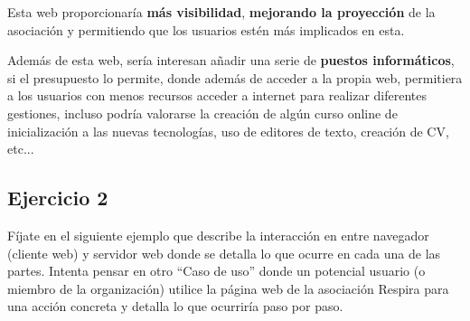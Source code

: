 Esta web proporcionaría \textbf{más visibilidad}, \textbf{mejorando la proyección} de la asociación y permitiendo que los usuarios estén más implicados en esta.

Además de esta web, sería interesan añadir una serie de\textbf{ puestos informáticos}, si el presupuesto lo permite, donde además de acceder a la propia web, permitiera a los usuarios con menos recursos acceder a internet para realizar diferentes gestiones, incluso podría valorarse la creación de algún curso online de inicialización a las nuevas tecnologías, uso de editores de texto, creación de CV, etc...

\subsection{Ejercicio 2}
Fíjate en el siguiente ejemplo que describe la interacción en entre navegador (cliente web) y servidor web donde se detalla lo que ocurre en cada una de las partes. Intenta pensar en otro ``Caso de uso'' donde un potencial usuario (o miembro de la organización) utilice la página web de la asociación Respira para una acción concreta y detalla lo que ocurriría paso por paso.

